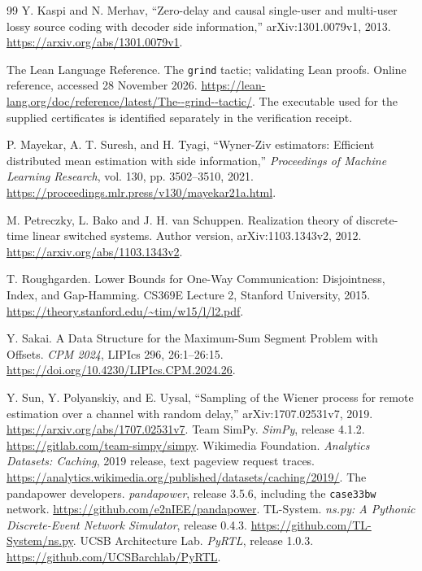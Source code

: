 \begin{thebibliography}{99}
 Y. Kaspi and N. Merhav, ``Zero-delay and causal single-user and multi-user lossy source coding with decoder side information,'' arXiv:1301.0079v1, 2013. \url{https://arxiv.org/abs/1301.0079v1}.

 The Lean Language Reference. The \texttt{grind} tactic; validating Lean proofs. Online reference, accessed 28 November 2026. \url{https://lean-lang.org/doc/reference/latest/The--grind--tactic/}. The executable used for the supplied certificates is identified separately in the verification receipt.

 P. Mayekar, A. T. Suresh, and H. Tyagi, ``Wyner-Ziv estimators: Efficient distributed mean estimation with side information,'' \emph{Proceedings of Machine Learning Research}, vol. 130, pp. 3502--3510, 2021. \url{https://proceedings.mlr.press/v130/mayekar21a.html}.

 M. Petreczky, L. Bako and J. H. van Schuppen. Realization theory of discrete-time linear switched systems. Author version, arXiv:1103.1343v2, 2012. \url{https://arxiv.org/abs/1103.1343v2}.

 T. Roughgarden. Lower Bounds for One-Way Communication: Disjointness, Index, and Gap-Hamming. CS369E Lecture 2, Stanford University, 2015. \url{https://theory.stanford.edu/~tim/w15/l/l2.pdf}.

 Y. Sakai. A Data Structure for the Maximum-Sum Segment Problem with Offsets. \emph{CPM 2024}, LIPIcs 296, 26:1--26:15. \url{https://doi.org/10.4230/LIPIcs.CPM.2024.26}.

 Y. Sun, Y. Polyanskiy, and E. Uysal, ``Sampling of the Wiener process for remote estimation over a channel with random delay,'' arXiv:1707.02531v7, 2019. \url{https://arxiv.org/abs/1707.02531v7}.
 Team SimPy. \emph{SimPy}, release 4.1.2. \url{https://gitlab.com/team-simpy/simpy}.
 Wikimedia Foundation. \emph{Analytics Datasets: Caching}, 2019 release, text pageview request traces. \url{https://analytics.wikimedia.org/published/datasets/caching/2019/}.
 The pandapower developers. \emph{pandapower}, release 3.5.6, including the \texttt{case33bw} network. \url{https://github.com/e2nIEE/pandapower}.
 TL-System. \emph{ns.py: A Pythonic Discrete-Event Network Simulator}, release 0.4.3. \url{https://github.com/TL-System/ns.py}.
 UCSB Architecture Lab. \emph{PyRTL}, release 1.0.3. \url{https://github.com/UCSBarchlab/PyRTL}.
\end{thebibliography}
